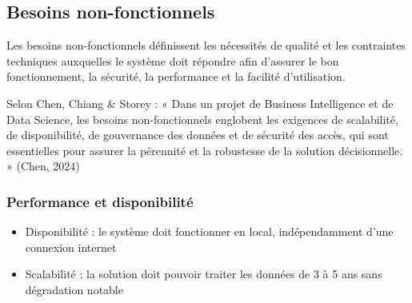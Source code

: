 \subsection{Besoins non-fonctionnels}
Les besoins non-fonctionnels définissent les nécessités de qualité et les contraintes techniques auxquelles le système doit répondre afin d’assurer le bon fonctionnement, la sécurité, la performance et la facilité d’utilisation.

Selon Chen, Chiang \& Storey : « Dans un projet de Business Intelligence et de Data Science, les besoins non-fonctionnels englobent les exigences de scalabilité, de disponibilité, de gouvernance des données et de sécurité des accès, qui sont essentielles pour assurer la pérennité et la robustesse de la solution décisionnelle. » \cite{Chen2024}(Chen, 2024)
\subsubsection{Performance et disponibilité}
\begin{itemize}
    \item Disponibilité : le système doit fonctionner en local, indépendamment d'une connexion internet
    \item Scalabilité : la solution doit pouvoir traiter les données de 3 à 5 ans sans dégradation notable
\end{itemize}
